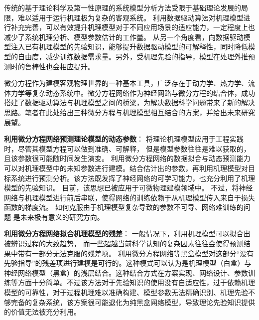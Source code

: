 

传统的基于理论科学及第一性原理的系统模型分析方法受限于基础理论发展的局限，难以适用于运行机理极为复杂的客观系统。
利用数据驱动算法对机理模型进行补充完善，可以有效提升机理模型对于不同应用场景的适应能力，一定程度上也减少了系统机理分析、模型参数估计的工作量。
从另一个角度看，向数据驱动模型注入已有机理模型的先验知识，能够提升数据驱动模型的可解释性，同时降低模型的自由度，减少训练数据需求量。另外，受机理先验的指导，模型在处理外推预测时的鲁棒性也会相应提升。

微分方程作为建模客观物理世界的一种基本工具，广泛存在于动力学、热力学、流体力学等复杂动态系统中。微分方程网络作为神经网路与微分方程的结合体，成功搭建了数据驱动算法与机理模型之间的桥梁，为解决数据科学问题带来了新的解决思路。笔者在此处给出三种微分方程与机理模型相互结合的方案，并给出未来研究展望。

\textbf{利用微分方程网络预测理论模型的动态参数}：
将理论机理模型应用于工程实践时，尽管其模型方程可以做到准确、可解释，
但是模型参数往往是难以获取的，且该参数很可能随时间发生演变。
利用微分方程网络的数据拟合与动态预测能力可以对机理模型中的未知参数进行建模。结合估计出的参数，再利用机理模型对目标系统进行预测分析。该方法既发挥了神经网络的可学习能力，也充分利用了机理模型的先验知识。
目前，该思想已被应用于可微物理建模领域中\cite{takahashi2021differentiable}。
不过，将神经网络与机理模型进行前后串联，使得网络的训练依赖于从机理模型传入来自于损失函数的梯度流。
如何克服由于机理模型复杂导致的参数不可导、网络难训练的问题
是未来极有意义的研究方向。

\textbf{利用微分方程网络拟合机理模型的残差}：
一般情况下，利用机理模型可以拟合出被辨识过程的大致趋势，
而一些超越当前科学认知的复杂因素往往会使得预测结果中带有一部分无法克服的残差项。
利用微分方程网络等黑盒模型对这部分“没有先验指导”的残差项进行建模是可行的。这种模式可以认为是机理模型（白盒）与神经网络模型（黑盒）的浅层结合。这种结合方式在方案实现、网络设计、参数训练等方面十分简单。不过该方法对于先验知识的使用没有自适应性，过于依赖机理模型的可靠性，对于过程机理难以准确构建、模型参数无法精确识别、机理先验不够完备的复杂系统，该方案很可能退化为纯黑盒网络模型，导致理论先验知识提供的价值无法被充分利用。

